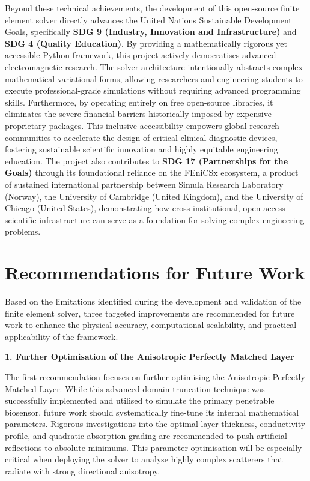 \documentclass[class=report, crop=false]{standalone}
\begin{document}
\vspace{12pt}

Beyond these technical achievements, the development of this open-source finite element solver directly advances the United Nations Sustainable Development Goals, specifically \textbf{SDG 9 (Industry, Innovation and Infrastructure)} and \textbf{SDG 4 (Quality Education)}. By providing a mathematically rigorous yet accessible Python framework, this project actively democratises advanced electromagnetic research. The solver architecture intentionally abstracts complex mathematical variational forms, allowing researchers and engineering students to execute professional-grade simulations without requiring advanced programming skills. Furthermore, by operating entirely on free open-source libraries, it eliminates the severe financial barriers historically imposed by expensive proprietary packages. This inclusive accessibility empowers global research communities to accelerate the design of critical clinical diagnostic devices, fostering sustainable scientific innovation and highly equitable engineering education. The project also contributes to \textbf{SDG 17 (Partnerships for the Goals)} through its foundational reliance on the FEniCSx ecosystem, a product of sustained international partnership between Simula Research Laboratory (Norway), the University of Cambridge (United Kingdom), and the University of Chicago (United States), demonstrating how cross-institutional, open-access scientific infrastructure can serve as a foundation for solving complex engineering problems.

\section{Recommendations for Future Work}

Based on the limitations identified during the development and validation of the finite element solver, three targeted improvements are recommended for future work to enhance the physical accuracy, computational scalability, and practical applicability of the framework.

\vspace{12pt}

\noindent\textbf{1. Further Optimisation of the Anisotropic Perfectly Matched Layer}

\vspace{6pt}

The first recommendation focuses on further optimising the Anisotropic Perfectly Matched Layer. While this advanced domain truncation technique was successfully implemented and utilised to simulate the primary penetrable biosensor, future work should systematically fine-tune its internal mathematical parameters. Rigorous investigations into the optimal layer thickness, conductivity profile, and quadratic absorption grading are recommended to push artificial reflections to absolute minimums. This parameter optimisation will be especially critical when deploying the solver to analyse highly complex scatterers that radiate with strong directional anisotropy.
\end{document}
